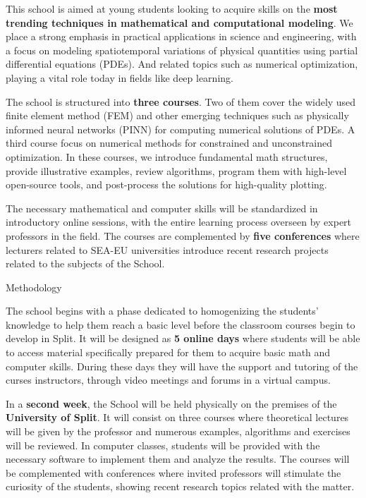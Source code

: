 \documentclass[
]{article}
\begin{document}
This school is aimed at young students looking to acquire skills on the
\textbf{most trending techniques in mathematical and computational
modeling}. We place a strong emphasis in practical applications in
science and engineering, with a focus on modeling spatiotemporal
variations of physical quantities using partial differential equations
(PDEs). And related topics such as numerical optimization, playing a
vital role today in fields like deep learning.

The school is structured into \textbf{three courses}. Two of them cover
the widely used finite element method (FEM) and other emerging
techniques such as physically informed neural networks (PINN) for
computing numerical solutions of PDEs. A third course focus on numerical
methods for constrained and unconstrained optimization. In these
courses, we introduce fundamental math structures, provide illustrative
examples, review algorithms, program them with high-level open-source
tools, and post-process the solutions for high-quality plotting.

The necessary mathematical and computer skills will be standardized in
introductory online sessions, with the entire learning process overseen
by expert professors in the field. The courses are complemented by
\textbf{five conferences} where lecturers related to SEA-EU universities
introduce recent research projects related to the subjects of the
School.

Methodology

The school begins with a phase dedicated to homogenizing the students'
knowledge to help them reach a basic level before the classroom courses
begin to develop in Split. It will be designed as \textbf{5 online days}
where students will be able to access material specifically prepared for
them to acquire basic math and computer skills. During these days they
will have the support and tutoring of the curses instructors, through
video meetings and forums in a virtual campus.

In a \textbf{second week}, the School will be held physically on the
premises of the \textbf{University of Split}. It will consist on three
courses where theoretical lectures will be given by the professor and
numerous examples, algorithms and exercises will be reviewed. In
computer classes, students will be provided with the necessary software
to implement them and analyze the results. The courses will be
complemented with conferences where invited professors will stimulate
the curiosity of the students, showing recent research topics related
with the matter.
\end{document}
